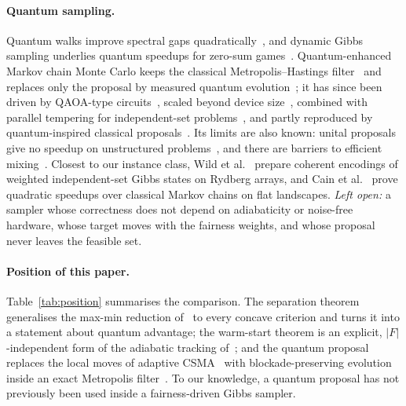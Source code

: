 \documentclass[11pt,a4paper]{article}
\begin{document}
\paragraph{Quantum sampling.}
Quantum walks improve spectral gaps quadratically~\cite{szegedy2004quantum,somma2008quantum}, and
dynamic Gibbs sampling underlies quantum speedups for zero-sum games~\cite{bouland2023quantum}.
Quantum-enhanced Markov chain Monte Carlo keeps the classical Metropolis--Hastings
filter~\cite{metropolis1953equation,hastings1970monte} and replaces only the proposal by measured
quantum evolution~\cite{layden2023quantum}; it has since been driven by QAOA-type
circuits~\cite{nakano2024markov}, scaled beyond device size~\cite{ferguson2025quantum},
combined with parallel tempering for independent-set problems~\cite{marshall2026quantum}, and
partly reproduced by quantum-inspired classical proposals~\cite{christmann2025quantum}. Its limits
are also known: unital proposals give no speedup on unstructured problems~\cite{orfi2024bounding}, and
there are barriers to efficient mixing~\cite{orfi2024barriers}. Closest to our instance class, Wild
et al.~\cite{wild2021quantum,wild2021phase} prepare coherent encodings of weighted independent-set
Gibbs states on Rydberg arrays, and Cain et al.~\cite{cain2023quantum} prove quadratic speedups over
classical Markov chains on flat landscapes. \emph{Left open:} a sampler whose correctness does not
depend on adiabaticity or noise-free hardware, whose target moves with the fairness weights, and whose
proposal never leaves the feasible set.

\paragraph{Position of this paper.}
Table~\ref{tab:position} summarises the comparison. The separation theorem generalises the
max-min reduction of~\cite{kawase2020maxmin} to every concave criterion and turns it into a
statement about quantum advantage; the warm-start theorem is an explicit, $|F|$-independent form of
the adiabatic tracking of~\cite{rajagopalan2009network}; and the quantum proposal replaces the
local moves of adaptive CSMA~\cite{jiang2010distributed} with blockade-preserving evolution inside
an exact Metropolis filter~\cite{layden2023quantum}. To our knowledge, a quantum proposal has not
previously been used inside a fairness-driven Gibbs sampler.
\end{document}
